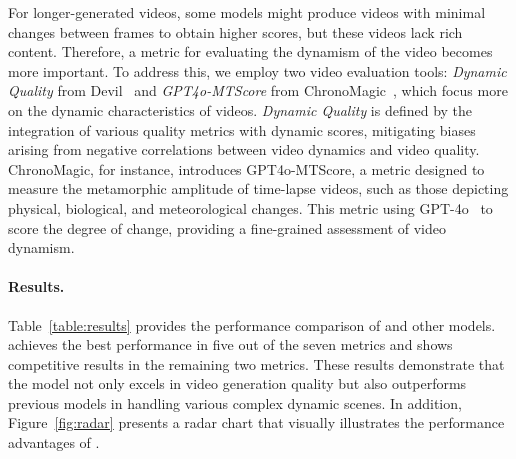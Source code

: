 For longer-generated videos, some models might produce videos with minimal changes between frames to obtain higher scores, but these videos lack rich content. 
Therefore, a metric for evaluating the dynamism of the video becomes more important. 
To address this, we employ two video evaluation tools:  \emph{Dynamic Quality} from Devil~\citep{liao2024evaluationtexttovideogenerationmodels} and \emph{GPT4o-MTScore} from ChronoMagic~\citep{yuan2024chronomagic}, which focus more on the dynamic characteristics of videos. 
\emph{Dynamic Quality} is defined by the integration of various quality metrics with dynamic scores, mitigating biases arising from negative correlations between video dynamics and video quality.
ChronoMagic, for instance, introduces {GPT4o-MTScore}, a metric designed to measure the metamorphic amplitude of time-lapse videos, such as those depicting physical, biological, and meteorological changes. 
This metric using GPT-4o~\citep{gpt4o} to score the degree of change, providing a fine-grained assessment of video dynamism. 



\paragraph{Results.} 
Table~\ref{table:results} provides the performance comparison of \model and other models. 
\model achieves the best performance in five out of the seven metrics and shows competitive results in the remaining two metrics. 
These results demonstrate that the model not only excels in video generation quality but also outperforms previous models in handling various complex dynamic scenes. 
In addition, Figure~\ref{fig:radar} presents a radar chart that visually illustrates the performance advantages of \model.


